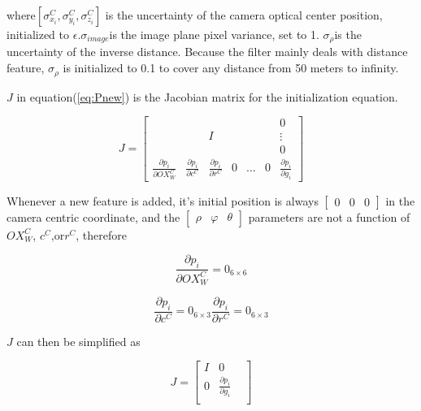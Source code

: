 \noindent where$[\sigma_{x_{i}}^{C}, \sigma_{y_{i}}^{C}, \sigma
_{z_{i}}^{C}]$ is the uncertainty of the camera optical center
position, initialized to $\epsilon $.$\sigma _{image}$is the image
plane pixel variance, set to 1. $\sigma _{\rho }$is the uncertainty of
the inverse distance. Because the filter mainly deals with distance
feature, $ \sigma _{\rho }$ is initialized to 0.1 to cover any
distance from 50 meters to infinity.

$J$ in equation(\ref{eq:Pnew}) is the Jacobian matrix for 
the initialization equation. 

\begin{equation}
J=\begin{bmatrix}
 & & & & & &0\\
 & &I& & & &\vdots\\ 
 & & & & & &0\\
\frac{\partial p_{i}}{\partial OX_{W}^{C}} &
\frac{\partial p_{i}}{\partial c^{C}} & 
\frac{\partial p_{i}}{\partial r^{C}} & 
0 & \ldots & 0 & 
\frac{\partial p_{i}}{\partial g_{i}} 
\end{bmatrix}
\end{equation}

Whenever a new feature is added, it's initial position is always $
\begin{bmatrix}0&0&0\end{bmatrix}$ in the camera centric coordinate,
and the $\begin{bmatrix}\rho&\varphi&\theta\end{bmatrix}$ parameters
are not a function of $ OX_{W}^{C}$, $c^{C}$,or$r^{C}$, therefore

\begin{equation}
\frac{\partial p_{i}}{\partial OX_{W}^{C}}=0_{6\times 6}
\end{equation}

\begin{equation}
\frac{\partial p_{i}}{\partial c^{C}}=0_{6\times 3}\frac{\partial 
p_{i}}{\partial r^{C}}= 0_{6\times 3}
\end{equation}

$J$ can then be simplified as

\begin{equation}
J=\begin{bmatrix}
I & 0 & \\
0 & \frac{\partial p_{i}}{\partial g_{i}} & \\
\end{bmatrix} 
\end{equation}


